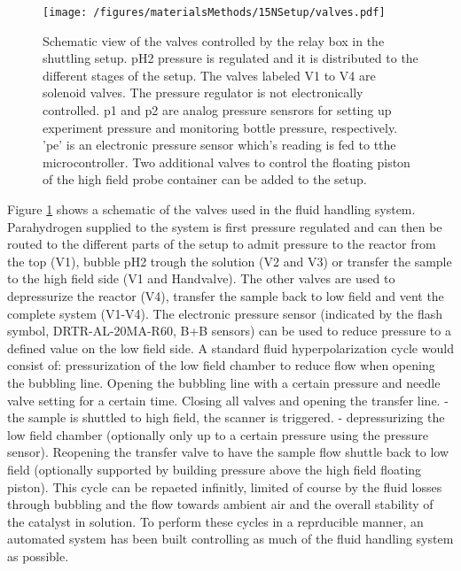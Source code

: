             \begin{figure}
                \texttt{[image: /figures/materialsMethods/15NSetup/valves.pdf]}
                \caption[Valve assembly shuttling system]{Schematic view of the valves controlled by the relay box in the shuttling setup. pH2 pressure is regulated and it is distributed to the different stages of the setup. The valves labeled V1 to V4 are solenoid valves. The pressure regulator is not electronically controlled. p1 and p2 are analog pressure sensrors for setting up experiment pressure and monitoring bottle pressure, respectively. 'pe' is an electronic pressure sensor which's reading is fed to tthe microcontroller. Two additional valves to control the floating piston of the high field probe container can be added to the setup.}
                \label{fig:materialsMethods:valveSetup}
            \end{figure}
            Figure \ref{fig:materialsMethods:valveSetup} shows a schematic of the valves used in the fluid handling system. Parahydrogen supplied to the system is first pressure regulated and can then be routed to the different parts of the setup to admit pressure to the reactor from the top (V1), bubble pH2 trough the solution (V2 and V3) or transfer the sample to the high field side (V1 and Handvalve). The other valves are used to depressurize the reactor (V4), transfer the sample back to low field and vent the complete system (V1-V4). The electronic pressure sensor (indicated by the flash symbol, DRTR-AL-20MA-R60, B+B sensors) can be used to reduce pressure to a defined value on the low field side.
            A standard fluid hyperpolarization cycle would consist of: pressurization of the low field chamber to reduce flow when opening the bubbling line.  Opening the bubbling line with a certain pressure and needle valve setting for a certain time.  Closing all valves and opening the transfer line. - the sample is shuttled to high field, the scanner is triggered. - depressurizing the low field chamber (optionally only up to a certain pressure using the pressure sensor).  Reopening the transfer valve to have the sample flow shuttle back to low field (optionally supported by building pressure above the high field floating piston).
            This cycle can be repaeted infinitly, limited of course by the fluid losses through bubbling and the flow towards ambient air and the overall stability of the catalyst in solution. 
            To perform these cycles in a reprducible manner, an automated system has been built controlling as much of the fluid handling system as possible.
